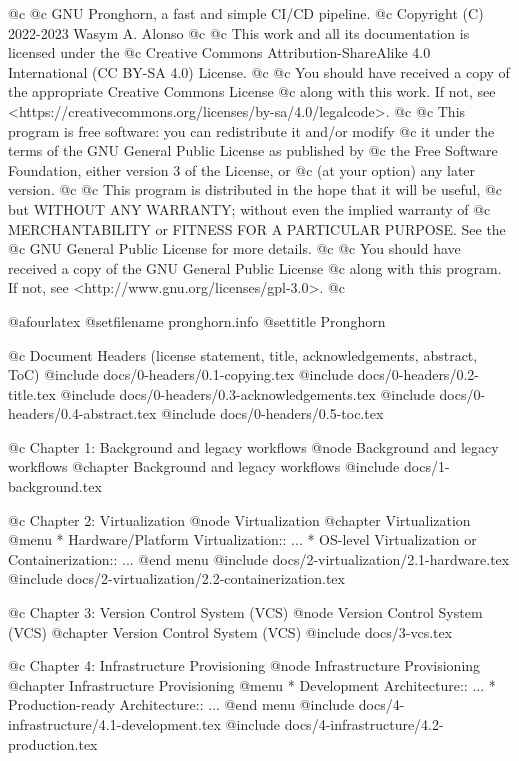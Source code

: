 


@c
@c GNU Pronghorn, a fast and simple CI/CD pipeline.
@c Copyright (C) 2022-2023 Wasym A. Alonso
@c
@c This work and all its documentation is licensed under the
@c Creative Commons Attribution-ShareAlike 4.0 International (CC BY-SA 4.0) License.
@c
@c You should have received a copy of the appropriate Creative Commons License
@c along with this work. If not, see <https://creativecommons.org/licenses/by-sa/4.0/legalcode>.
@c
@c This program is free software: you can redistribute it and/or modify
@c it under the terms of the GNU General Public License as published by
@c the Free Software Foundation, either version 3 of the License, or
@c (at your option) any later version.
@c
@c This program is distributed in the hope that it will be useful,
@c but WITHOUT ANY WARRANTY; without even the implied warranty of
@c MERCHANTABILITY or FITNESS FOR A PARTICULAR PURPOSE. See the
@c GNU General Public License for more details.
@c
@c You should have received a copy of the GNU General Public License
@c along with this program. If not, see <http://www.gnu.org/licenses/gpl-3.0>.
@c


@afourlatex
@setfilename pronghorn.info
@settitle Pronghorn


@c Document Headers (license statement, title, acknowledgements, abstract, ToC)
@include docs/0-headers/0.1-copying.tex
@include docs/0-headers/0.2-title.tex
@include docs/0-headers/0.3-acknowledgements.tex
@include docs/0-headers/0.4-abstract.tex
@include docs/0-headers/0.5-toc.tex


@c Chapter 1: Background and legacy workflows
@node Background and legacy workflows
@chapter Background and legacy workflows
@include docs/1-background.tex


@c Chapter 2: Virtualization
@node Virtualization
@chapter Virtualization
@menu
* Hardware/Platform Virtualization:: ...
* OS-level Virtualization or Containerization:: ...
@end menu
@include docs/2-virtualization/2.1-hardware.tex
@include docs/2-virtualization/2.2-containerization.tex


@c Chapter 3: Version Control System (VCS)
@node Version Control System (VCS)
@chapter Version Control System (VCS)
@include docs/3-vcs.tex


@c Chapter 4: Infrastructure Provisioning
@node Infrastructure Provisioning
@chapter Infrastructure Provisioning
@menu
* Development Architecture:: ...
* Production-ready Architecture:: ...
@end menu
@include docs/4-infrastructure/4.1-development.tex
@include docs/4-infrastructure/4.2-production.tex


